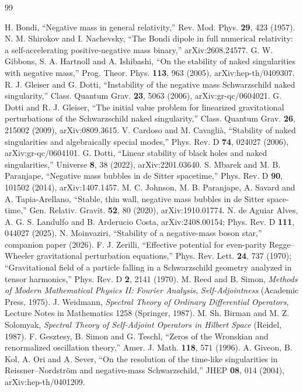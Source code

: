 \documentclass[11pt]{article}
\theoremstyle{remark}
\begin{document}
\begin{thebibliography}{99}

 H. Bondi, ``Negative mass in general relativity,'' Rev. Mod. Phys. \textbf{29}, 423 (1957).
 N. M. Shirokov and I. Nachevsky, ``The Bondi dipole in full numerical relativity: a
self-accelerating positive-negative mass binary,'' arXiv:2608.24577.
 G. W. Gibbons, S. A. Hartnoll and A. Ishibashi, ``On the stability of naked singularities with
negative mass,'' Prog. Theor. Phys. \textbf{113}, 963 (2005), arXiv:hep-th/0409307.
 R. J. Gleiser and G. Dotti, ``Instability of the negative mass Schwarzschild naked singularity,''
Class. Quantum Grav. \textbf{23}, 5063 (2006), arXiv:gr-qc/0604021.
 G. Dotti and R. J. Gleiser, ``The initial value problem for linearized gravitational perturbations of
the Schwarzschild naked singularity,'' Class. Quantum Grav. \textbf{26}, 215002 (2009), arXiv:0809.3615.
 V. Cardoso and M. Cavagli\`a, ``Stability of naked singularities and algebraically special modes,''
Phys. Rev. D \textbf{74}, 024027 (2006), arXiv:gr-qc/0604101.
 G. Dotti, ``Linear stability of black holes and naked singularities,'' Universe \textbf{8}, 38
(2022), arXiv:2201.03640.
 S. Mbarek and M. B. Paranjape, ``Negative mass bubbles in de Sitter spacetime,'' Phys. Rev. D
\textbf{90}, 101502 (2014), arXiv:1407.1457.
 M. C. Johnson, M. B. Paranjape, A. Savard and A. Tapia-Arellano, ``Stable, thin wall, negative mass
bubbles in de Sitter space-time,'' Gen. Relativ. Gravit. \textbf{52}, 80 (2020), arXiv:1910.01774.
 N. de Aguiar Alves, A. G. S. Landulfo and B. Arderucio Costa, arXiv:2408.00154; Phys. Rev. D
\textbf{111}, 044027 (2025).
 N. Moinvaziri, ``Stability of a negative-mass boson star,'' companion paper (2026).
 F. J. Zerilli, ``Effective potential for even-parity Regge--Wheeler gravitational perturbation
equations,'' Phys. Rev. Lett. \textbf{24}, 737 (1970); ``Gravitational field of a particle falling in a Schwarzschild
geometry analyzed in tensor harmonics,'' Phys. Rev. D \textbf{2}, 2141 (1970).
 M. Reed and B. Simon, \emph{Methods of Modern Mathematical Physics II: Fourier Analysis,
Self-Adjointness} (Academic Press, 1975).
 J. Weidmann, \emph{Spectral Theory of Ordinary Differential Operators}, Lecture Notes in
Mathematics 1258 (Springer, 1987).
 M. Sh. Birman and M. Z. Solomyak, \emph{Spectral Theory of Self-Adjoint Operators in Hilbert
Space} (Reidel, 1987).
 F. Gesztesy, B. Simon and G. Teschl, ``Zeros of the Wronskian and renormalized oscillation theory,''
Amer. J. Math. \textbf{118}, 571 (1996).
 A. Giveon, B. Kol, A. Ori and A. Sever, ``On the resolution of the time-like singularities in
Reissner--Nordstr\"om and negative-mass Schwarzschild,'' JHEP \textbf{08}, 014 (2004), arXiv:hep-th/0401209.

\end{thebibliography}
\end{document}
